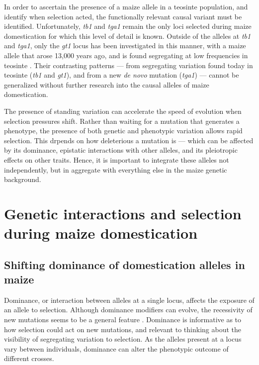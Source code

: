 \documentclass[9pt,twocolumn,twoside]{rilabRxiv}
\begin{document}
In order to ascertain the presence of a maize allele in a teosinte population, and identify when selection acted, the functionally relevant causal variant must be identified.
Unfortunately, \textit{tb1} and \textit{tga1} remain the only loci selected during maize domestication for which this level of detail is known.
Outside of the alleles at \textit{tb1} and \textit{tga1}, only the \textit{gt1} locus has been investigated in this manner, with a maize allele that arose 13,000 years ago, and is found segregating at low frequencies in teosinte \citep{wills2013}.
Their contrasting patterns --- from segregating variation found today in teosinte (\textit{tb1} and \textit{gt1}), and from a new \textit{de novo} mutation (\textit{tga1}) --- cannot be generalized without further research into the causal alleles of maize domestication.

The presence of standing variation can accelerate the speed of evolution when selection pressures shift.
Rather than waiting for a mutation that generates a phenotype, the presence of both genetic and phenotypic variation allows rapid selection.
This drpends on how deleterious a mutation is --- which can be affected by its dominance, epistatic interactions with other alleles, and its pleiotropic effects on other traits.
Hence, it is important to integrate these alleles not independently, but in aggregate with everything else in the maize genetic background.

\section*{Genetic interactions and selection during maize domestication}
\subsection*{Shifting dominance of domestication alleles in maize}

Dominance, or interaction between alleles at a single locus, affects the exposure of an allele to selection.
Although dominance modifiers can evolve, the recessivity of new mutations seems to be a general feature \citep{orr1991}.
Dominance is informative as to how selection could act on new mutations, and relevant to thinking about the visibility of segregating variation to selection.
As the alleles present at a locus vary between individuals, dominance can alter the phenotypic outcome of different crosses.
\end{document}
